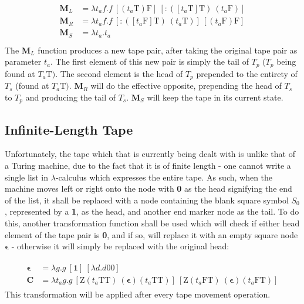 \documentclass[Master.tex]{subfiles}
\begin{document}
\begin{gather*}
\begin{aligned}
\bm{M}_L &= \lambda t_a f.f\ [(t_a\bm{\mathrm{T}})\bm{\mathrm{F}}]\ [\bm{\mathrm{:}}([t_a\bm{\mathrm{T}}]\bm{\mathrm{T}})\ (t_a\bm{\mathrm{F}})]\\
\bm{M}_R &= \lambda t_a f.f\ [\bm{\mathrm{:}}([t_a\bm{\mathrm{F}}]\bm{\mathrm{T}})\ (t_a\bm{\mathrm{T}})]\ [(t_a\bm{\mathrm{F}})\bm{\mathrm{F}}]\\
\bm{M}_S &= \lambda t_a.t_a\\
\end{aligned}
\end{gather*}
The $\bm{M}_L$ function produces a new tape pair, after taking the original tape pair as parameter $t_a$. The first element of this new pair is simply the tail of $T_p$ ($T_p$ being found at $T_a\bm{\mathrm{T}})$. The second element is the head of $T_p$ prepended to the entirety of $T_s$ (found at $T_a\bm{\mathrm{T}})$. $\bm{M}_R$ will do the effective opposite, prepending the head of $T_s$ to $T_p$ and producing the tail of $T_s$. $\bm{M}_S$ will keep the tape in its current state.

\subsection{Infinite-Length Tape}

Unfortunately, the tape which that is currently being dealt with is unlike that of a Turing machine, due to the fact that it is of finite length - one cannot write a single list in $\lambda$-calculus which expresses the entire tape. As such, when the machine moves left or right onto the node with \textbf{0} as the head signifying the end of the list, it shall be replaced with a node containing the blank square symbol $S_0$, represented by a \textbf{1}, as the head, and another end marker node as the tail. To do this, another transformation function shall be used which will check if either head element of the tape pair is \textbf{0}, and if so, will replace it with an empty square node $\bm{\epsilon}$ - otherwise it will simply be replaced with the original head:

\begin{gather*}
\begin{aligned}
\bm{\epsilon} &= \lambda g.g\ [\bm{\textbf{1}}]\ [\lambda d.d\bm{\mathrm{0}}\bm{\mathrm{0}}] \\
\bm{C} &= \lambda t_a g.g\ [\bm{\mathrm{Z}}(t_a\bm{\mathrm{T}}\bm{\mathrm{T}})\ (\bm{\epsilon})(t_a\bm{\mathrm{T}}\bm{\mathrm{T}})]\ [\bm{\mathrm{Z}}(t_a\bm{\mathrm{F}}\bm{\mathrm{T}})\ (\bm{\epsilon})(t_a\bm {\mathrm{F}}\bm{\mathrm{T}})]
\end{aligned}
\end{gather*}
This transformation will be applied after every tape movement operation.
\end{document}
